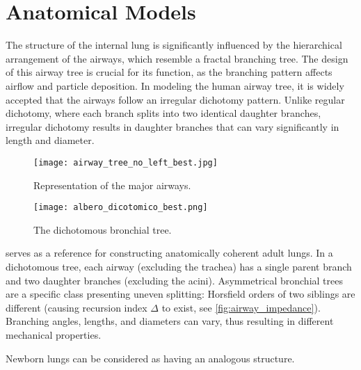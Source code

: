 \section{Anatomical Models}
\label{subsec:anatomical_models}

The structure of the internal lung is significantly influenced by the
hierarchical arrangement of the airways, which resemble a fractal
branching tree\cite{suki2011}. The design of this airway tree is
crucial for its function, as the branching pattern affects 
airflow and particle deposition. In modeling the human airway tree, it
is widely accepted that the airways follow an irregular dichotomy
pattern. Unlike regular dichotomy, where each branch splits into two
identical daughter branches, irregular dichotomy results in daughter
branches that can vary significantly in length and diameter.

\begin{figure}[H]\centering
  \texttt{[image: airway\_tree\_no\_left\_best.jpg]}
  \caption{Representation of the major airways.}
  \label{fig:airway_tree_anatomical}
\end{figure}

\begin{figure}[H]\centering
  \texttt{[image: albero\_dicotomico\_best.png]}
  \caption{The dichotomous bronchial tree.}
  \label{fig:albero_dicotomico_anatomical}
\end{figure}

 serves as a reference for
constructing anatomically coherent adult lungs. In a dichotomous tree,
each airway (excluding the trachea) has a single parent branch and two
daughter branches (excluding the acini).  Asymmetrical bronchial trees
are a specific class presenting uneven splitting: Horsfield orders of
two siblings are different (causing recursion index $\Delta$
to exist, see \cref{fig:airway_impedance}).  Branching angles, lengths, and diameters can vary, thus resulting in different mechanical
properties.

Newborn lungs can be considered as having an analogous structure.


